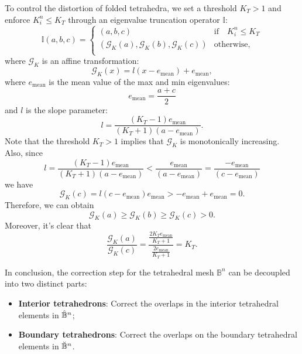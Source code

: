\documentclass{article}
\begin{document}
To control the distortion of folded tetrahedra, we set a threshold $K_{T} > 1$ and enforce $K^n_i \leq K_T$ through an eigenvalue truncation operator $\mathbb{I}$:
\begin{equation}\label{eqt:truncation}
        \mathbb I(a,b,c) = 
      \left \{
    \begin{array}{ll}
     (a,b,c)    & \text{if} \quad K^n_i \leq K_{T} \\
     \left( \mathcal{G}_K(a), \mathcal{G}_K(b), \mathcal{G}_K(c) \right)     & \text{otherwise}, \\
    \end{array}  
    \right.
\end{equation}
where $\mathcal{G}_K$ is an affine transformation:
\begin{equation}
    \mathcal{G}_K(x) = l(x-e_\text{mean}) + e_\text{mean},
\end{equation}
where $e_\text{mean}$ is the mean value of the max and min eigenvalues:
\begin{equation}
    e_\text{mean} = \frac{a + c}{2}
\end{equation}
 and $l$ is the slope parameter:
\begin{equation}
    l = \frac{(K_T - 1)e_\text{mean}}{(K_T + 1)(a - e_\text{mean})}.
\end{equation}
Note that the threshold $K_{T} >1$ implies that $\mathcal{G}_K$ is monotonically increasing. Also, since
\begin{equation}
    l = \frac{(K_T - 1)e_\text{mean}}{(K_T + 1)(a - e_\text{mean})} < \frac{e_\text{mean}}{(a - e_\text{mean})} = \frac{-e_\text{mean}}{(c - e_\text{mean})}
\end{equation}
we have 
\begin{equation}
    \mathcal{G}_K(c) = l(c-e_\text{mean})e_\text{mean} > -e_\text{mean} + e_\text{mean} = 0.
\end{equation}
Therefore, we can obtain 
\begin{equation}
    \mathcal{G}_K(a) \geq \mathcal{G}_K(b) \geq \mathcal{G}_K(c) >0.
\end{equation}
 Moreover, it's clear that 
\begin{equation}
    \frac{\mathcal{G}_K(a)}{\mathcal{G}_K(c)} = \frac{\frac{2K_T e_\text{mean}}{K_T + 1}}{\frac{2e_\text{mean}}{K_T + 1}} = K_T.
\end{equation}

In conclusion, the correction step for the tetrahedral mesh $\mathbb B^n$ can be decoupled into two distinct parts: 
\begin{itemize}
    \item \textbf{Interior tetrahedrons}: Correct the overlaps in the interior tetrahedral elements in $\Hat{\mathbb{B}}^n$;
    \item \textbf{Boundary tetrahedrons}: Correct the overlaps on the boundary tetrahedral elements in $\Breve{\mathbb{B}}^n$.
\end{itemize}
\end{document}
